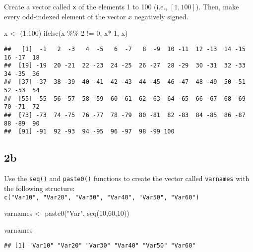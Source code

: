 \documentclass[
]{article}
\newenvironment{Shaded}{\begin{snugshade}}{\end{snugshade}}
\newcommand{\DecValTok}[1]{\textcolor[rgb]{0.00,0.00,0.81}{#1}}
\newcommand{\FunctionTok}[1]{\textcolor[rgb]{0.00,0.00,0.00}{#1}}
\newcommand{\NormalTok}[1]{#1}
\newcommand{\OtherTok}[1]{\textcolor[rgb]{0.56,0.35,0.01}{#1}}
\newcommand{\SpecialCharTok}[1]{\textcolor[rgb]{0.00,0.00,0.00}{#1}}
\newcommand{\StringTok}[1]{\textcolor[rgb]{0.31,0.60,0.02}{#1}}
\begin{document}
Create a vector called \texttt{x} of the elements 1 to 100 (i.e.,
\([1,100]\)). Then, make every odd-indexed element of the vector \(x\)
negatively signed.

\begin{Shaded}
\begin{Highlighting}[]
\NormalTok{x }\OtherTok{\textless{}{-}}\NormalTok{ (}\DecValTok{1}\SpecialCharTok{:}\DecValTok{100}\NormalTok{)}
\FunctionTok{ifelse}\NormalTok{(x }\SpecialCharTok{\%\%} \DecValTok{2} \SpecialCharTok{!=} \DecValTok{0}\NormalTok{, x}\SpecialCharTok{*{-}}\DecValTok{1}\NormalTok{, x)}
\end{Highlighting}
\end{Shaded}

\begin{verbatim}
##   [1]  -1   2  -3   4  -5   6  -7   8  -9  10 -11  12 -13  14 -15  16 -17  18
##  [19] -19  20 -21  22 -23  24 -25  26 -27  28 -29  30 -31  32 -33  34 -35  36
##  [37] -37  38 -39  40 -41  42 -43  44 -45  46 -47  48 -49  50 -51  52 -53  54
##  [55] -55  56 -57  58 -59  60 -61  62 -63  64 -65  66 -67  68 -69  70 -71  72
##  [73] -73  74 -75  76 -77  78 -79  80 -81  82 -83  84 -85  86 -87  88 -89  90
##  [91] -91  92 -93  94 -95  96 -97  98 -99 100
\end{verbatim}

\hypertarget{b-1}{%
\subsection{2b}\label{b-1}}

Use the \texttt{seq()} and \texttt{paste0()} functions to create the
vector called \texttt{varnames} with the following structure:
\texttt{c("Var10",\ "Var20",\ "Var30",\ "Var40",\ "Var50",\ "Var60")}

\begin{Shaded}
\begin{Highlighting}[]
\NormalTok{varnames }\OtherTok{\textless{}{-}} \FunctionTok{paste0}\NormalTok{(}\StringTok{"Var"}\NormalTok{, }\FunctionTok{seq}\NormalTok{(}\DecValTok{10}\NormalTok{,}\DecValTok{60}\NormalTok{,}\DecValTok{10}\NormalTok{))}

\NormalTok{varnames}
\end{Highlighting}
\end{Shaded}

\begin{verbatim}
## [1] "Var10" "Var20" "Var30" "Var40" "Var50" "Var60"
\end{verbatim}
\end{document}
